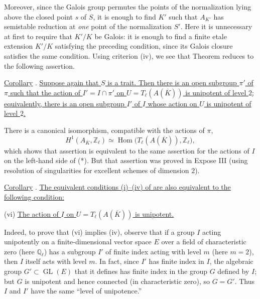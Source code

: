 Moreover, since the Galois group permutes the points of the normalization
lying above the closed point $s$ of $S$, it is enough to find $K'$ such
that $A_{K'}$ has semistable reduction at \emph{one} point of the
normalization $S'$.  Here it is unnecessary at first to require that
$K'/K$ be Galois: it is enough to find a finite etale extension $K'/K$
satisfying the preceding condition, since its Galois closure satisfies the
same condition.  Using criterion (iv), we see that Theorem  reduces
to the following assertion.

\medskip
\noindent
\underline{Corollary} . \underline{Suppose again that $S$ is a trait.
Then there is an open subgroup $\pi'$ of $\pi$ such that the action of
$I'=I\cap\pi'$ on $U=T_\ell(A(\overline K))$ is unipotent of level $2$;
equivalently, there is an open subgroup $I'$ of $I$ whose action on $U$ is
unipotent of level $2$.}

There is a canonical isomorphism, compatible with the actions of $\pi$,
\begin{equation}\tag{*}
 H^1(A_{\overline K},\mathbb Z_\ell)
 \simeq
 \operatorname{Hom}\bigl(T_\ell(A(\overline K)),\mathbb Z_\ell\bigr),
\end{equation}
which shows that assertion  is equivalent to the same assertion for
the actions of $I$ on the left-hand side of (*).  But that assertion was
proved in Expose III (using resolution of singularities for excellent
schemes of dimension $2$).

\medskip
\noindent
\underline{Corollary} . \underline{The equivalent conditions (i)--(iv)
of  are also equivalent to the following condition:}

\smallskip
\noindent
(vi) \quad \underline{The action of $I$ on
$U=T_\ell(A(\overline K))$ is unipotent.}

Indeed, to prove that (vi) implies (iv), observe that if a group $I$
acting unipotently on a finite-dimensional vector space $E$ over a field
of characteristic zero (here $\mathbb Q_\ell$) has a subgroup $I'$ of
finite index acting with level $m$ (here $m=2$), then $I$ itself acts with
level $m$.  In fact, since $I'$ has finite index in $I$, the algebraic
group $G'\subset\operatorname{GL}(E)$ that it defines has finite index in
the group $G$ defined by $I$; but $G$ is unipotent and hence connected (in
characteristic zero), so $G=G'$.  Thus $I$ and $I'$ have the same
``level of unipotence.''

